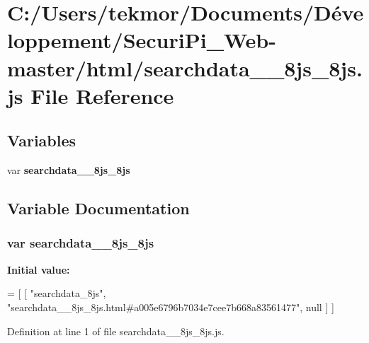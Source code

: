 \section{C\+:/\+Users/tekmor/\+Documents/\+Développement/\+Securi\+Pi\+\_\+\+Web-\/master/html/searchdata\+\_\+\+\_\+8js\+\_\+8js.js File Reference}
\label{searchdata____8js__8js_8js}
\subsection*{Variables}
\begin{DoxyCompactItemize}
\item 
var {\bf searchdata\+\_\+\+\_\+8js\+\_\+8js}
\end{DoxyCompactItemize}


\subsection{Variable Documentation}
\subsubsection[{searchdata\+\_\+\+\_\+8js\+\_\+8js}]{\setlength{\rightskip}{0pt plus 5cm}var searchdata\+\_\+\+\_\+8js\+\_\+8js}\label{searchdata____8js__8js_8js_a7f6e9d8a102e00f735e2769863380b6a}
{\bfseries Initial value\+:}
\begin{DoxyCode}
=
[
    [ \textcolor{stringliteral}{"searchdata\_8js"}, \textcolor{stringliteral}{"searchdata\_\_8js\_8js.html#a005e6796b7034e7cee7b668a83561477"}, null ]
]
\end{DoxyCode}


Definition at line 1 of file searchdata\+\_\+\+\_\+8js\+\_\+8js.\+js.

